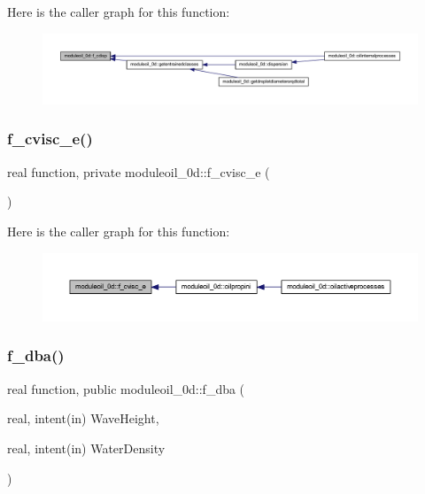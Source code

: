 Here is the caller graph for this function\+:\nopagebreak
\begin{figure}[H]
\begin{center}
\leavevmode
\includegraphics[width=350pt]{namespacemoduleoil__0d_aec999ef14a345781bcc8300cd1c2999f_icgraph}
\end{center}
\end{figure}
\mbox{\label{namespacemoduleoil__0d_aa41484e186e3a6c29ae4d6e5b3bbdc1e}} 
\subsubsection{\texorpdfstring{f\+\_\+cvisc\+\_\+e()}{f\_cvisc\_e()}}
{\footnotesize\ttfamily real function, private moduleoil\+\_\+0d\+::f\+\_\+cvisc\+\_\+e (\begin{DoxyParamCaption}{ }\end{DoxyParamCaption})\hspace{0.3cm}{\ttfamily [private]}}

Here is the caller graph for this function\+:\nopagebreak
\begin{figure}[H]
\begin{center}
\leavevmode
\includegraphics[width=350pt]{namespacemoduleoil__0d_aa41484e186e3a6c29ae4d6e5b3bbdc1e_icgraph}
\end{center}
\end{figure}
\mbox{\label{namespacemoduleoil__0d_a4505ef2294ae0f155df322a4eac4bf20}} 
\subsubsection{\texorpdfstring{f\+\_\+dba()}{f\_dba()}}
{\footnotesize\ttfamily real function, public moduleoil\+\_\+0d\+::f\+\_\+dba (\begin{DoxyParamCaption}\item[{real, intent(in)}]{Wave\+Height,  }\item[{real, intent(in)}]{Water\+Density }\end{DoxyParamCaption})}

